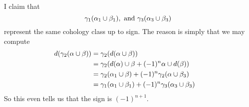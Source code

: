 \noindent
I claim that
$$
\gamma_1( \alpha_1 \cup \beta_1),\ \hbox{and}\ 
\gamma_3( \alpha_3 \cup \beta_3)
$$
represent the same cohology class up to sign.
The reason is simply that we may compute
\begin{align}
d( \gamma_2(\alpha \cup \beta) )
& =
\gamma_2( d( \alpha \cup \beta) )
\cr
& =
\gamma_2( d(\alpha) \cup \beta + (-1)^n \alpha \cup d(\beta) )
\cr
& =
\gamma_2( \alpha_1 \cup \beta)  + (-1)^n \gamma_2( \alpha \cup \beta_3)
\cr
& =
\gamma_1( \alpha_1 \cup \beta_1) + (-1)^n \gamma_3( \alpha_3 \cup \beta_3)
\end{align}
So this even tells us that the sign is $(-1)^{n+1}$.












